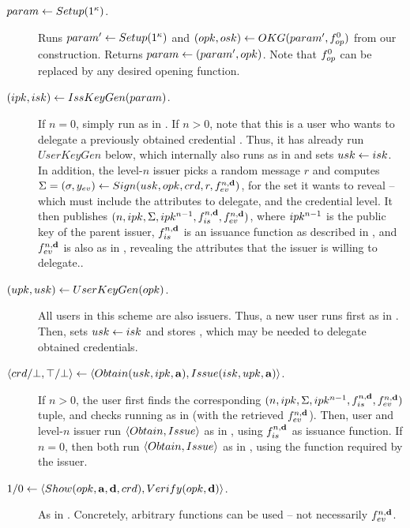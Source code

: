 \begin{description}
\item[$param \gets Setup(1^\kappa)$.]  Runs $param' \gets Setup(1^\kappa)$
    and $(opk,osk) \gets OKG(param',f_{op}^0)$ from our \CUASGen
    construction. Returns $param \gets (param',opk)$. Note that $f_{op}^0$ can
    be replaced by any desired opening function.
\item[$(ipk,isk) \gets IssKeyGen(param)$.] If $n=0$, simply run \IKeyGen as
  in \CUASAC. If $n>0$, note that this is a user who wants to delegate a
  previously obtained credential \cred. Thus, it has already run $UserKeyGen$
  below, which internally also runs \IKeyGen as in \CUASGen and sets $usk \gets
  isk$. In addition, the level-$n$ issuer picks a random message $r$ and
  computes $\Sigma = (\sigma,y_{ev}) \gets Sign(usk,opk,crd,r,
  f_{ev}^{n,\mathbf{d}})$, for the \dattrs set it wants to reveal -- which must
  include the attributes to delegate, and the credential level. It then
  publishes $(n,ipk,\Sigma,ipk^{n-1},f_{is}^{n,\mathbf{d}},f_{ev}^{n,\mathbf{d}})$,
  where $ipk^{n-1}$ is the public key of the parent issuer,
  $f_{is}^{n,\mathbf{d}}$ is an issuance function as described in
  , and $f_{ev}^{n,\mathbf{d}}$ is also as in
  , revealing the attributes that the issuer is willing to
  delegate..
\item[$(upk,usk) \gets UserKeyGen(opk)$.] All users in this scheme are
  also issuers. Thus, a new user runs first \IKeyGen as in \CUASGen. Then, sets
  $usk \gets isk$ and stores \ipk, which may be needed to delegate obtained
  credentials.
\item[$\langle crd/\bot,\top/\bot \rangle \gets
  \langle Obtain(usk,ipk,\mathbf{a}),Issue(isk,upk,\mathbf{a}) \rangle$.]
  If $n>0$, the user first finds the corresponding $(n,ipk,\Sigma,ipk^{n-1},
  f_{is}^{n,\mathbf{d}},f_{ev}^{n,\mathbf{d}})$ tuple, and checks \Sig running
  \Verify as in \CUASGen (with the retrieved $f_{ev}^{n,\mathbf{d}}$). Then,
  user and level-$n$ issuer run $\langle Obtain,Issue\rangle$ as in \CUASGen,
  using $f_{is}^{n,\mathbf{d}}$ as issuance function. If $n=0$, then both run
  $\langle Obtain,Issue\rangle$ as in \CUASGen, using the \fissue function
  required by the issuer.
\item[$1/0 \gets \langle Show(opk,\mathbf{a},\mathbf{d},crd),
  Verify(opk,\mathbf{d}) \rangle$.] As in \CUASGen. Concretely, arbitrary
  \feval functions can be used -- not necessarily $f_{ev}^{n,\mathbf{d}}$.
\end{description}

